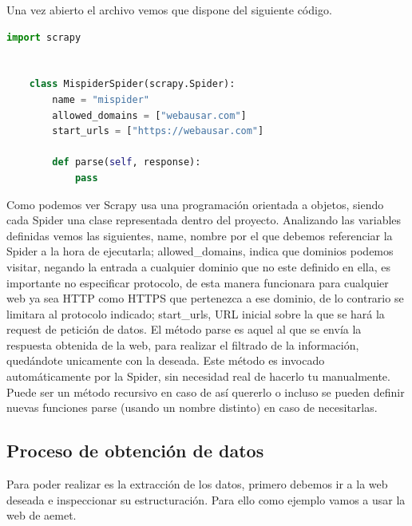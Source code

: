 Una vez abierto el archivo vemos que dispone del siguiente código.

\begin{lstlisting}[language=Python, caption={Spider recién generada}]
	import scrapy
	
	
	class MispiderSpider(scrapy.Spider):
		name = "mispider"
		allowed_domains = ["webausar.com"]
		start_urls = ["https://webausar.com"]
	
		def parse(self, response):
			pass
\end{lstlisting}

Como podemos ver Scrapy usa una programación orientada a objetos, siendo cada Spider una clase representada dentro del proyecto.\newline
\newline
Analizando las variables definidas vemos las siguientes, name, nombre por el que debemos referenciar la Spider a la hora de ejecutarla; allowed\_domains, indica que dominios podemos visitar, negando la entrada a cualquier dominio que no este definido en ella, es importante no especificar protocolo, de esta manera funcionara para cualquier web ya sea HTTP como HTTPS que pertenezca a ese dominio, de lo contrario se limitara al protocolo indicado; start\_urls, URL inicial sobre la que se hará la request de petición de datos.\newline
\newline
El método parse es aquel al que se envía la respuesta obtenida de la web, para realizar el filtrado de la información, quedándote unicamente con la deseada. Este método es invocado automáticamente por la Spider, sin necesidad real de hacerlo tu manualmente. Puede ser un método recursivo en caso de así quererlo o incluso se pueden definir nuevas funciones parse (usando un nombre distinto) en caso de necesitarlas.

\subsection{Proceso de obtención de datos}
Para poder realizar es la extracción de los datos, primero debemos ir a la web deseada e inspeccionar su estructuración. Para ello como ejemplo vamos a usar la web de aemet.\newline

